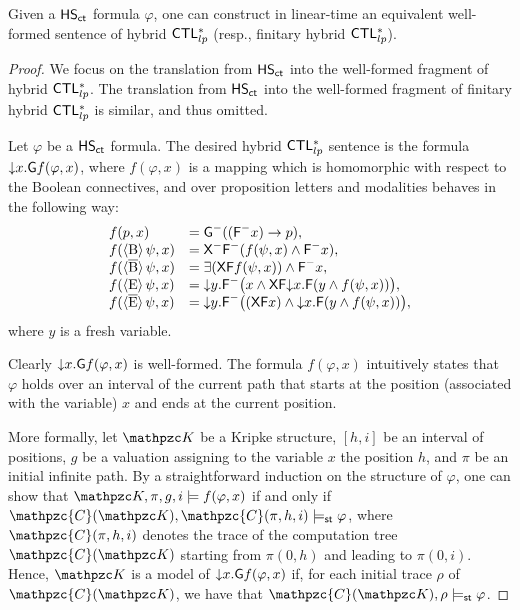 \begin{proposition}\label{prop:HSComputationToHybrid} Given a $\text{\sffamily HS}_{\mathsf{ct}}$ formula $\varphi$, one can construct in linear-time an equivalent well-formed
sentence of hybrid $\text{\sffamily CTL$^{*}_{lp}$}$ (resp., finitary hybrid $\text{\sffamily CTL$^{*}_{lp}$}$).
\end{proposition}
\begin{proof}
We focus on the translation from $\text{\sffamily HS}_{\mathsf{ct}}$ into the well-formed fragment of hybrid $\text{\sffamily CTL$^{*}_{lp}$}$. The translation from $\text{\sffamily HS}_{\mathsf{ct}}$ into the well-formed fragment
of finitary hybrid $\text{\sffamily CTL$^{*}_{lp}$}$ is similar, and thus omitted.

Let $\varphi$ be a $\text{\sffamily HS}_{\mathsf{ct}}$ formula. The desired hybrid $\text{\sffamily CTL$^{*}_{lp}$}$ sentence is the formula
$\text{$\downarrow$$x$} .\textsf{G} f(\varphi,x)$, where $f(\varphi,x)$ is a mapping which is homomorphic with respect to 
the Boolean connectives, and over proposition letters and modalities behaves in the following way:
\[ \begin{array}{ll}
f(p,x) & = \textsf{G}^{-}((\textsf{F}^{-}x ) \rightarrow p),\\
f(\operatorname{\langle B\rangle}\psi,x) & = \textsf{X}^{-}\textsf{F}^{-}(f(\psi,x)\wedge \textsf{F}^{-}x) ,\\
f(\operatorname{\langle \overline{B}\rangle}\psi,x) & = \exists(\textsf{X}\textsf{F} f(\psi,x)) \wedge \textsf{F}^{-}x,\\
f(\operatorname{\langle E\rangle}\psi,x) & = \text{$\downarrow$$y$}.\textsf{F}^{-}\bigl(x \wedge \textsf{X}\textsf{F} \text{$\downarrow$$x$}.\textsf{F}(y\wedge f(\psi,x))\bigr ) ,\\
f(\operatorname{\langle \overline{E}\rangle}\psi,x) & = \text{$\downarrow$$y$}.\textsf{F}^{-}\bigl((\textsf{X}\textsf{F} x) \wedge  \text{$\downarrow$$x$}.\textsf{F}(y\wedge f(\psi,x))\bigr ),
\end{array} \]
where $y$ is a fresh variable.

Clearly $\text{$\downarrow$$x$} .\textsf{G} f(\varphi,x)$ is well-formed. The formula $f(\varphi,x)$ intuitively states that $\varphi$ holds over an 
interval of the current path that starts at the position (associated with the variable) $x$ and ends at the current position.

More formally, let $\Ku$ be a Kripke structure, $[h,i]$ be an interval of positions, $g$ be a valuation assigning to 
the variable $x$ the position $h$, and $\pi$ be an initial infinite path.
By a straightforward induction on the structure of  $\varphi$, one can show that
 $\Ku,\pi,g,i\models f(\varphi,x)$ if and only if  $\mathpzc{C}(\Ku),\mathpzc{C}(\pi,h,i)\models_\stat \varphi$, where
$\mathpzc{C}(\pi,h,i)$ denotes the trace of the computation tree $\mathpzc{C}(\Ku)$ starting from $\pi(0,h)$ and leading to $\pi(0,i)$.
Hence, $\Ku$ is a model of $\text{$\downarrow$$x$} .\textsf{G} f(\varphi,x)$ if, for each initial trace $\rho$ of $\mathpzc{C}(\Ku)$, we have that
$\mathpzc{C}(\Ku),\rho\models_\stat \varphi$.
\end{proof}


